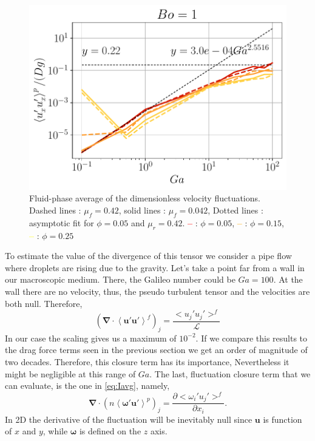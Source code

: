 \begin{figure}[h!]
    \includegraphics[height=0.20\textheight]{image/N_10/UU/UU_pxx_Bo_1.pdf}
    \caption{Fluid-phase average of the dimensionless velocity fluctuations. Dashed lines : $\mu_f = 0.42$, solid lines : $\mu_f = 0.042$, Dotted lines : asymptotic fit for $\phi = 0.05$ and $\mu_r = 0.42$. \textcolor{red}{\textbf{--}} : $\phi = 0.05$, \textcolor{orange}{\textbf{--}} : $\phi = 0.15$, \textcolor{yellow}{\textbf{--}} : $\phi = 0.25$} 
    \label{fig:UUp}
\end{figure} 
To estimate the value of the divergence of this tensor we consider a pipe flow where droplets are rising due to the gravity. 
Let's take a point far from a wall in our macroscopic medium. 
There, the Galileo number could be $Ga = 100$.
At the wall there are no velocity, thus, the pseudo turbulent tensor and the velocities are both null.   
Therefore, 
\begin{equation*}    
    \left(\bm{\nabla} \cdot \left<\bm{u}'\bm{u}'\right>^f \right)_j = \frac{<u_j' u_j'>^f}{\mathcal{L}}
\end{equation*}
In our case the scaling gives us a maximum of $10^{-2}$. 
If we compare this results to the drag force terms seen in the previous section we get an order of magnitude of two decades.
Therefore, this closure term has its importance, Nevertheless it might be negligible at this range of $Ga$. 
The last, fluctuation closure term that we can evaluate, is the one in \ref{eq:Iavg}, namely, 
\begin{equation}
    \bm{\nabla}\cdot(n\left<\bm{\omega'u'}\right>^p)_j 
    = \frac{\partial <\omega_i' u_j'>^f}{\partial x_i}.
\end{equation}
In 2D the derivative of the fluctuation will be inevitably null since $\bm{u}$ is function of $x$ and $y$, while $\bm{\omega}$ is defined on the $z$ axis.


